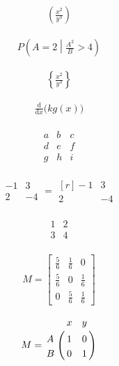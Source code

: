 \documentclass{article}
\begin{document}
\begin{align*}
\left(\frac{x^2}{y^3}\right)
\end{align*}

\begin{align*}
P\left(A=2\middle|\frac{A^2}{B}>4\right)
\end{align*}

\begin{align*}
\left\{\frac{x^2}{y^3}\right\}
\end{align*}

\begin{align*}
\frac{\mathrm d}{\mathrm d x} \big( k g(x) \big)
\end{align*}

\begin{align*}
\begin{matrix}
	a & b & c \\
	d & e & f \\
	g & h & i
\end{matrix}
\end{align*}

\begin{align*} %
\begin{matrix}
-1 & 3 \\
2 & -4
\end{matrix}
=
\begin{matrix*}[r]
-1 & 3 \\
2 & -4
\end{matrix*}
\end{align*}

\begin{align*}
\begin{array}{c|c}
	1 & 2 \\ 
	\hline
	3 & 4
\end{array}
\end{align*}

\begin{align*}
M = \begin{bmatrix}
\frac{5}{6} & \frac{1}{6} & 0           \\[0.3em]
\frac{5}{6} & 0           & \frac{1}{6} \\[0.3em]
0           & \frac{5}{6} & \frac{1}{6}
\end{bmatrix}
\end{align*}

\begin{align*}
M = \bordermatrix{~ & x & y \cr
	A & 1 & 0 \cr
	B & 0 & 1 \cr}
\end{align*}
\end{document}
